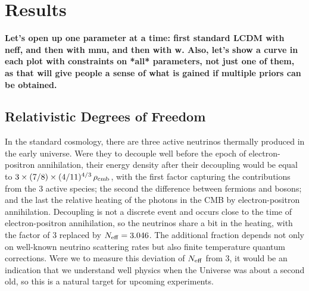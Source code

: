 \documentclass[aps,prd,reprint,superscriptaddress]{revtex4-1}
\begin{document}
\section{Results \label{sec:results}}

{\bf Let's open up one parameter at a time: first standard LCDM with neff, and then with mnu, and then with w. Also, let's show a curve in each plot with constraints on *all*  parameters, not just one of them, as that will give people a sense of what is gained if multiple priors can be obtained.}

\subsection{Relativistic Degrees of Freedom}

In the standard cosmology, there are three active neutrinos thermally produced in the early universe. Were they to decouple well before the epoch of electron-positron annihilation, their energy density after their decoupling would be equal to $3\times (7/8)\times (4/11)^{4/3}\,\rho_{\rm cmb}$, with the first factor capturing the contributions from the 3 active species; the second the difference between fermions and bosons; and the last the relative heating of the photons in the CMB by electron-positron annihilation. Decoupling is not a discrete event and occurs close to the time of electron-positron annihilation, so the neutrinos share a bit in the heating, with the factor of 3 replaced by $N_{\rm eff}=3.046$. The additional fraction depends not only on well-known neutrino scattering rates but also finite temperature quantum corrections. Were we to measure this deviation of $N_{\rm eff}$ from 3, it would be an indication that we understand well physics when the Universe was about a second old, so this is a natural target for upcoming experiments.
\end{document}

